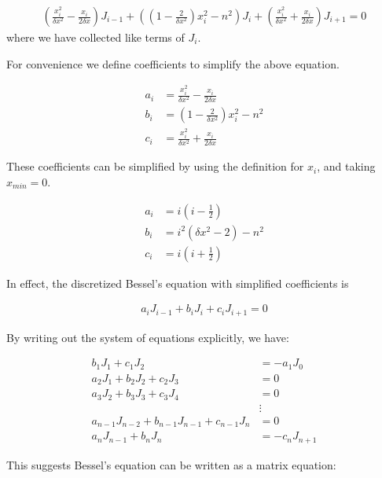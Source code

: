 \documentclass[onecolumn, groupedaddress, 10pt]{revtex4-1}
\begin{document}
\begin{align}
\left(\frac{x_i^2}{\delta x^2} - \frac{x_i}{2\delta x}\right) J_{i-1}
	+ \left( \left(1-\frac{2}{\delta x^2}\right)x_i^2 - n^2 \right) J_i
	+ \left(\frac{x_i^2}{\delta x^2} + \frac{x_i}{2\delta x}\right) J_{i+1}
	= 0
\end{align}
where we have collected like terms of $J_i$.

For convenience we define coefficients to simplify the above equation.

\begin{align}
a_i &= \frac{x_i^2}{\delta x^2} - \frac{x_i}{2\delta x} 	\\
b_i &= \left(1-\frac{2}{\delta x^2}\right)x_i^2 - n^2  	\\
c_i &= \frac{x_i^2}{\delta x^2} + \frac{x_i}{2\delta x}
\end{align}

These coefficients can be simplified by using the definition for $x_i$, and taking $x_{min} = 0$.

\begin{align}
a_i &= i   \left( i - \frac{1}{2} \right)				\\
b_i &= i^2 \left( \delta x^2 - 2  \right) - n^2 		 	\\
c_i &= i   \left( i + \frac{1}{2} \right)
\end{align}

In effect, the discretized Bessel's equation with simplified coefficients is

\begin{align}
a_i J_{i-1} + b_i J_i + c_i J_{i+1} = 0
\end{align}

By writing out the system of equations explicitly, we have:

\begin{align}
b_1 J_1 + c_1 J_2                                 &= - a_1 J_0		\\
a_2 J_1 + b_2 J_2 + c_2 J_3                       &= 0				\\
a_3 J_2 + b_3 J_3 + c_3 J_4                       &= 0				\\
                                                  &\vdots				\\
a_{n-1} J_{n-2} + b_{n-1} J_{n-1} + c_{n-1} J_{n} &=   0				\\
a_n J_{n-1} + b_n J_n                             &= - c_n J_{n+1}
\end{align}

This suggests Bessel's equation can be written as a matrix equation:
\end{document}
